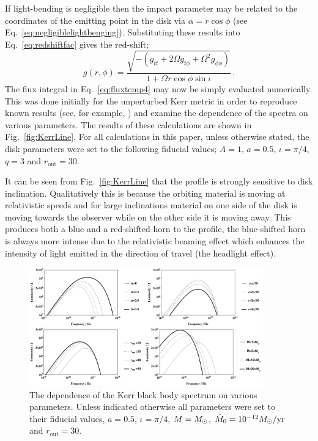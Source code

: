 If light-bending is negligible then the impact parameter may be related to the coordinates of the emitting point in the disk via $\alpha = r\cos\phi $ (see Eq.\ \ref{eq:negligiblelightbenging}). Substituting these results into Eq.\ \ref{eq:redshiftfac} gives the red-shift;
\begin{equation} g\left(r,\phi \right)=\frac{\sqrt{-\left( g_{tt}+2\Omega g_{t\phi}+\Omega^{2}g_{\phi\phi} \right)}}{1+\Omega r \cos \phi \sin \iota} \, . \end{equation}
The flux integral in Eq.\ \ref{eq:fluxtemp4} may now be simply evaluated numerically. This was done initially for the unperturbed Kerr metric in order to reproduce known results (see, for example, \cite{1991MNRAS.250..629K,1991ApJ...376...90L}) and examine the dependence of the spectra on various parameters. The results of these calculations are shown in Fig.\ \ref{fig:KerrLine}. For all calculations in this paper, unless otherwise stated, the disk parameters were set to the following fiducial values; $A=1$, $a=0.5$, $\iota=\pi/4$, $q=3$ and $r_{\textrm{out}}=30$.

It can be seen from Fig.\ \ref{fig:KerrLine} that the profile is strongly sensitive to disk inclination. Qualitatively this is because the orbiting material is moving at relativistic speeds and for large inclinations material on one side of the disk is moving towards the observer while on the other side it is moving away. This produces both a blue and a red-shifted horn to the profile, the blue-shifted horn is always more intense due to the relativistic beaming effect which enhances the intensity of light emitted in the direction of travel (the headlight effect). 

\begin{figure}[t]
 \centering
 \includegraphics[trim=0cm 0cm 0cm 0cm, width=0.9\textwidth]{KerrTherm.pdf}
 \caption{The dependence of the Kerr black body spectrum on various parameters. Unless indicated otherwise all parameters were set to their fiducial values, $a=0.5$, $\iota=\pi/4$, $M=M_{ \odot }$, $\dot{M}_{0}=10^{-12}M_{ \odot }/\textrm{yr}$ and $r_{\textrm{out}}=30$.}
 \label{fig:KerrTherm}
\end{figure}

